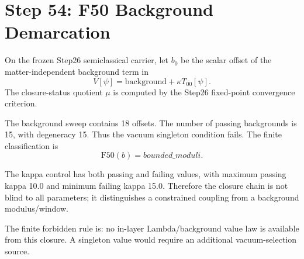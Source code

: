 \section*{Step 54: F50 Background Demarcation}

On the frozen Step26 semiclassical carrier, let \(b_0\) be the scalar offset
of the matter-independent background term in
\[
V[\psi]=\mathrm{background}+\kappa T_{00}[\psi].
\]
The closure-status quotient \(\mu\) is computed by the Step26 fixed-point
convergence criterion.

The background sweep contains 18 offsets.  The number of passing
backgrounds is 15, with degeneracy
15.
Thus the vacuum singleton condition fails.  The finite classification is
\[
\mathrm{F50}(b)=bounded\_moduli .
\]

The kappa control has both passing and failing values, with maximum passing
kappa 10.0 and minimum failing kappa
15.0.  Therefore the closure chain is not
blind to all parameters; it distinguishes a constrained coupling from a
background modulus/window.

The finite forbidden rule is: no in-layer Lambda/background value law is
available from this closure.  A singleton value would require an additional
vacuum-selection source.
